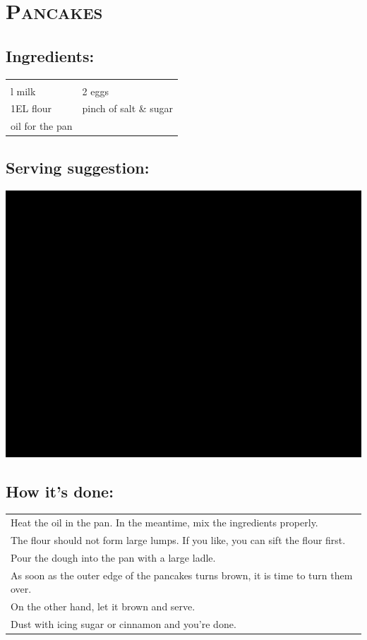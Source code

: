 \section{\textsc{Pancakes}}

\subsection*{Ingredients:}

\begin{tabular}{p{7.5cm} p{7.5cm}}
	& \\
	\sfrac{1}{4}l milk & 2 eggs \\
	1EL flour & pinch of salt \& sugar \\
  oil for the pan
\end{tabular}

\subsection*{Serving suggestion:}

\includegraphics[width=\textwidth]{img/ph.jpg} \cite{pfannkuchen}

\subsection*{How it's done:}

\begin{tabular}{p{15cm}}
	\\
  Heat the oil in the pan. In the meantime, mix the ingredients properly.\\
  The flour should not form large lumps. If you like, you can sift the flour first.\\
  Pour the dough into the pan with a large ladle.\\
  As soon as the outer edge of the pancakes turns brown, it is time to turn them over.\\
  On the other hand, let it brown and serve.\\
  Dust with icing sugar or cinnamon and you're done.
\end{tabular}
